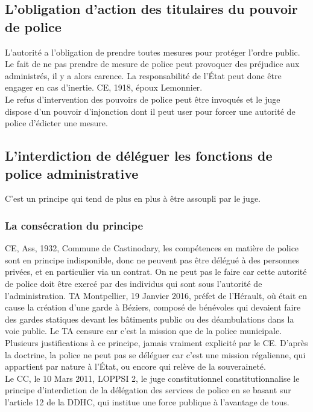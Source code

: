 \documentclass[10pt, a4paper, openany]{book}
\begin{document}
\subsection{L'obligation d'action des titulaires du pouvoir de police}

L'autorité a l'obligation de prendre toutes mesures pour protéger l'ordre public. Le fait de ne pas prendre de mesure de police peut provoquer des préjudice aux administrés, il y a alors carence. La responsabilité de l'État peut donc être engager en cas d'inertie. CE, 1918, époux Lemonnier. \\
Le refus d'intervention des pouvoirs de police peut être invoqués et le juge dispose d'un pouvoir d'injonction dont il peut user pour forcer une autorité de police d'édicter une mesure. 

\subsection{L'interdiction de déléguer les fonctions de police administrative}

C'est un principe qui tend de plus en plus à être assoupli par le juge. \\

\subsubsection{La consécration du principe}

CE, Ass, 1932, Commune de Castinodary, les compétences en matière de police sont en principe indisponible, donc ne peuvent pas être délégué à des personnes privées, et en particulier via un contrat. On ne peut pas le faire car cette autorité de police doit être exercé par des individus qui sont sous l'autorité de l'administration. TA Montpellier, 19 Janvier 2016, préfet de l'Hérault, où était en cause la création d'une garde à Béziers, composé de bénévoles qui devaient faire des gardes statiques devant les bâtiments public ou des déambulations dans la voie public. Le TA censure car c'est la mission que de la police municipale. \\
Plusieurs justifications à ce principe, jamais vraiment explicité par le CE. D'après la doctrine, la police ne peut pas se déléguer car c'est une mission régalienne, qui appartient par nature à l'État, ou encore qui relève de la souveraineté. \\
Le CC, le 10 Mars 2011, LOPPSI 2, le juge constitutionnel constitutionnalise le principe d'interdiction de la délégation des services de police en se basant sur l'article 12 de la DDHC, qui institue une force publique à l'avantage de tous. 
\end{document}
